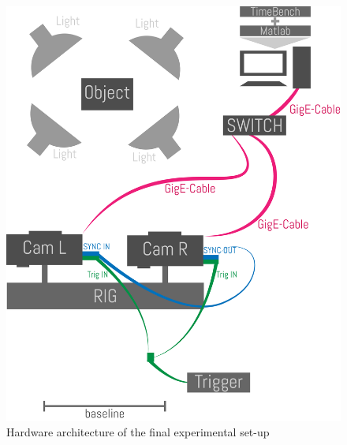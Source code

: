\begin{figure}[htbp]
		\centering
		\includegraphics[width=1.0\textwidth]{figures/HardwareArchitecture}
		\caption[Hardware architecture of the final experimental set-up]{Hardware architecture of the final experimental set-up}
		\label{fig:HardwareArchitecture}
\end{figure}

